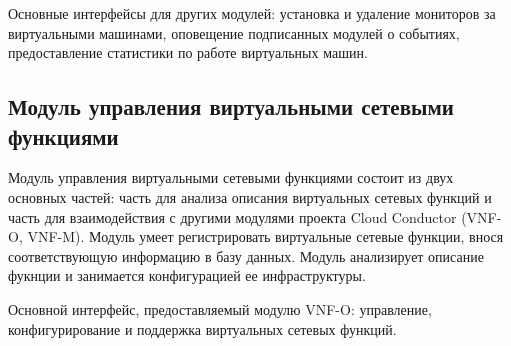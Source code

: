 \documentclass[oneside,final,14pt,a4paper]{extreport}
\begin{document}
Основные интерфейсы для других модулей: установка и удаление мониторов за виртуальными машинами, оповещение подписанных модулей о событиях, предоставление статистики по работе виртуальных машин.

\subsection{Модуль управления виртуальными сетевыми функциями}
Модуль управления виртуальными сетевыми функциями состоит из двух основных частей: часть для анализа описания виртуальных сетевых функций и часть для взаимодействия с другими модулями проекта Cloud Conductor (VNF-O, VNF-M). Модуль умеет регистрировать виртуальные сетевые функции, внося соответствующую информацию в базу данных. Модуль анализирует описание фукнции и занимается конфигурацией ее инфраструктуры.

Основной интерфейс, предоставляемый модулю VNF-O: управление, конфигурирование и поддержка виртуальных сетевых функций.
\end{document}
